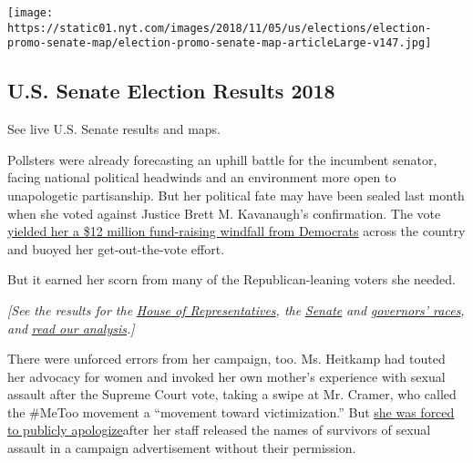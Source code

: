 \href{https://www.nytimes.com/interactive/2018/11/06/us/elections/results-senate-elections.html}{}

\texttt{[image: https://static01.nyt.com/images/2018/11/05/us/elections/election-promo-senate-map/election-promo-senate-map-articleLarge-v147.jpg]}

\hypertarget{us-senate-election-results-2018}{%
\subsection{U.S. Senate Election Results
2018}\label{us-senate-election-results-2018}}

See live U.S. Senate results and maps.

Pollsters were already forecasting an uphill battle for the incumbent
senator, facing national political headwinds and an environment more
open to unapologetic partisanship. But her political fate may have been
sealed last month when she voted against Justice Brett M. Kavanaugh's
confirmation. The vote
\href{https://www.nytimes.com/2018/10/27/us/politics/heitkamp-kavanaugh-fund-raising.html}{yielded
her a \$12 million fund-raising windfall from Democrats} across the
country and buoyed her get-out-the-vote effort.

But it earned her scorn from many of the Republican-leaning voters she
needed.

\emph{{[}See the results for the}
\emph{\href{https://www.nytimes.com/interactive/2018/11/06/us/elections/results-house-elections.html?action=click\&module=Spotlight\&pgtype=Homepage}{House
of Representatives}, the}
\emph{\href{https://www.nytimes.com/interactive/2018/11/06/us/elections/results-senate-elections.html}{Senate}}
\emph{and}
\emph{\href{https://www.nytimes.com/interactive/2018/11/06/us/elections/results-governor-elections.html?action=click\&module=Intentional\&pgtype=Article}{governors'
races}, and}
\emph{\href{https://www.nytimes.com/2018/11/06/us/politics/midterm-elections-results.html}{read
our analysis}.{]}}

There were unforced errors from her campaign, too. Ms. Heitkamp had
touted her advocacy for women and invoked her own mother's experience
with sexual assault after the Supreme Court vote, taking a swipe at Mr.
Cramer, who called the \#MeToo movement a ``movement toward
victimization.'' But
\href{https://www.nytimes.com/2018/10/16/us/politics/heitkamp-north-dakota-ad-apology.html}{she
was forced to publicly apologize}after her staff released the names of
survivors of sexual assault in a campaign advertisement without their
permission.

